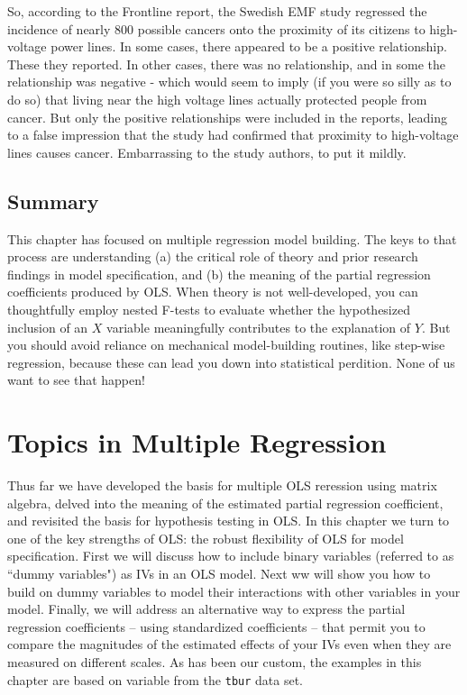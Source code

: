 \documentclass[11pt,openany]{book}\usepackage[]{graphicx}\usepackage[]{color}
\begin{document}
{So, according to the Frontline report, the Swedish EMF study regressed the incidence of nearly  800 possible cancers onto the proximity of its citizens to high-voltage power lines. In some cases, there appeared to be a positive relationship. These they reported. In other cases, there was no relationship, and in some the relationship was negative - which would seem to imply (if you were so silly as to do so) that living near the high voltage lines actually protected people from cancer. But only the positive relationships were included in the reports, leading to a false impression that the study had confirmed that proximity to high-voltage lines causes cancer. Embarrassing to the study authors, to put it mildly.

\section{Summary}

This chapter has focused on multiple regression model building. The keys to that process are understanding (a) the critical role of theory and prior research findings in model specification, and (b) the meaning of the partial regression coefficients produced by OLS. When theory is not well-developed, you can thoughtfully employ nested F-tests to evaluate whether the hypothesized inclusion of an $X$ variable meaningfully contributes to the explanation of $Y$. But you should avoid reliance on mechanical model-building routines, like step-wise regression, because these can lead you down into statistical perdition. None of us want to see that happen!







\chapter{Topics in Multiple Regression}


Thus far we have developed the basis for multiple OLS reression using matrix algebra, delved into the meaning of the estimated partial regression coefficient, and revisited the basis for hypothesis testing in OLS. In this chapter we turn to one of the key strengths of OLS: the robust flexibility of OLS for model specification. First we will discuss how to include binary variables (referred to as ``dummy variables") as IVs in an OLS model. Next ww will show you how to build on dummy variables to model their interactions with other variables in your model. Finally, we will address an alternative way to express the partial regression coefficients -- using standardized coefficients -- that permit you to compare the magnitudes of the estimated effects of your IVs even when they are measured on different scales. As has been our custom, the examples in this chapter are based on variable from the \texttt{tbur} data set.  

}
\end{document}
